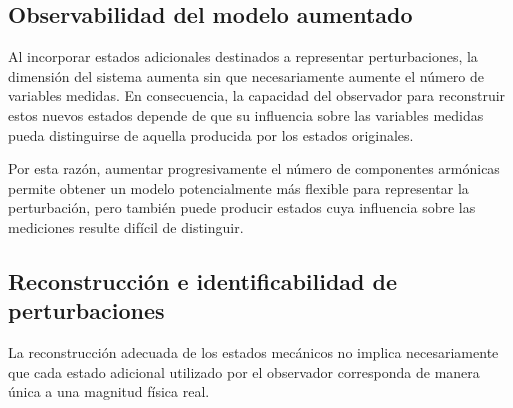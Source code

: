 
\subsection{Observabilidad del modelo aumentado}

%
%

Al incorporar estados adicionales destinados a representar perturbaciones, 
la dimensión del sistema aumenta sin que necesariamente aumente el número de 
variables medidas. En consecuencia, la capacidad del observador para 
reconstruir estos nuevos estados depende de que su influencia sobre las 
variables medidas pueda distinguirse de aquella producida por los estados 
originales.

Por esta razón, aumentar progresivamente el número de componentes armónicas 
permite obtener un modelo potencialmente más flexible para representar la 
perturbación, pero también puede producir estados cuya influencia sobre las 
mediciones resulte difícil de distinguir.



\subsection{Reconstrucción e identificabilidad de perturbaciones}

%
%
%

La reconstrucción adecuada de los estados mecánicos no implica necesariamente 
que cada estado adicional utilizado por el observador corresponda de manera 
única a una magnitud física real.

